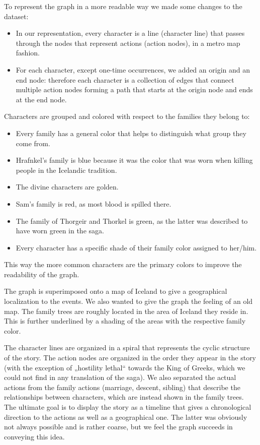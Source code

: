 \documentclass[runningheads]{llncs}
\begin{document}
To represent the graph in a more readable way we made some changes to the dataset:
\begin{itemize}
	\item In our representation, every character is a line (character line) that passes through the nodes that represent actions (action nodes), in a metro map fashion.
	\item For each character, except one-time occurrences, we added an origin and an end node: therefore each character is a collection of edges that connect multiple action nodes forming a path that starts at the origin node and ends at the end node.
\end{itemize}
Characters are grouped and colored with respect to the families they belong to: 
\begin{itemize}
	\item Every family has a general color that helps to distinguish what group they come from.
	\item Hrafnkel's family is blue because it was the color that was worn when killing people in the Icelandic tradition.
	\item The divine characters are golden.
	\item Sam's family is red, as most blood is spilled there.
	\item The family of Thorgeir and Thorkel is green, as the latter was described to have worn green in the saga.
	\item Every character has a specific shade of their family color assigned to her/him.
\end{itemize}
This way the more common characters are the primary colors to improve the readability of the graph.

The graph is superimposed onto a map of Iceland to give a geographical localization to the events. We also wanted to give the graph the feeling of an old map. The family trees are roughly located in the area of Iceland they reside in. This is further underlined by a shading of the areas with the respective family color.

The character lines are organized in a spiral that represents the cyclic structure of the story.
The action nodes are organized in the order they appear in the story (with the exception of „hostility lethal“ towards the King of Greeks, which we could not find in any translation of the saga). We also separated the actual actions from the family actions (marriage, descent, sibling) that describe the relationships between characters, which are instead shown in the family trees. The ultimate goal is to display the story as a timeline that gives a chronological direction to the actions as well as a geographical one. The latter was obviously not always possible and is rather coarse, but we feel the graph succeeds in conveying this idea.
\end{document}
